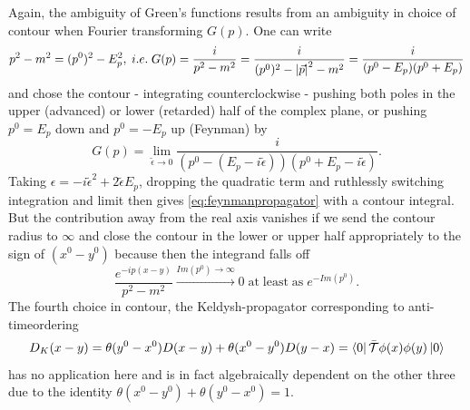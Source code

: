 Again, the ambiguity of Green’s functions results from an ambiguity in choice of contour when Fourier
transforming $G(p)$. One can write
\begin{equation}
	p^2 -m^2 = (p^0)^2 - E^2_p, \; i.e.\; G(p) = \frac{i}{p^2-m^2}=\frac{i}{(p^0)^2 - \abs{\vec{p}}^2 -m^2} = \frac{i}{(p^0-E_p)(p^0+E_p)}
	\end{equation}
and chose the contour - integrating counterclockwise - pushing both poles in the upper (advanced)
or lower (retarded) half of the complex plane, or pushing $p^0 = E_p$ down and $p^0 = −E_p$ up (Feynman) by
\begin{equation}
G(p) = \lim_{\tilde{\epsilon} \rightarrow 0} \frac{i}{(p^0-(E_p-i \tilde{\epsilon})) (p^0+E_p - i \tilde{\epsilon})}.
\end{equation}
Taking $\epsilon = - i \tilde{\epsilon}^2 + 2 \tilde{\epsilon}E_p$, dropping the quadratic term and ruthlessly switching integration and
limit then gives \ref{eq:feynmanpropagator} with a contour integral. But the contribution away from the real axis vanishes
if we send the contour radius to $\infty$ and close the contour in the lower or upper half appropriately
to the sign of $(x^0 − y^0 )$ because then the integrand falls off
\begin{equation}
\frac{e^{-ip(x-y)}}{p^2-m^2} \stackrel{Im(p^0)\rightarrow \infty}{\longrightarrow}0 \mathrm{\; at\;least\; as\;} e^{-Im(p^0)}.
\end{equation}
The fourth choice in contour, the Keldysh-propagator corresponding to anti-timeordering
\begin{equation}
	\label{eq:keldyshpropagator}
	D_K(x-y) =\theta(y^0-x^0) D(x-y) + \theta(x^0-y^0) D(y-x) = \bra{0}\bar{ \mathcal{T}} \phi(x) \phi(y) \ket{0}
\end{equation}
has no application here and is in fact algebraically dependent on the other three due to the identity
$θ(x^0 − y^0 ) + θ(y^0 − x^0 ) = 1$.

